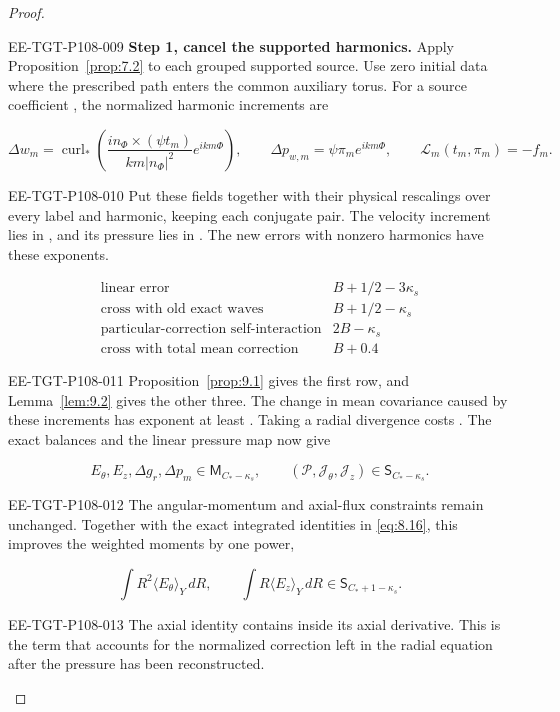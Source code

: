 \begin{proof}
\begin{EESegment}{EE-TGT-P108-009}
\noindent\textbf{Step 1, cancel the supported harmonics.} Apply
Proposition~\ref{prop:7.2} to each grouped supported source. Use zero initial data where the
prescribed path enters the common auxiliary torus. For a source coefficient
, the normalized harmonic increments are
\end{EESegment}
\[
\Delta w_m=\operatorname{curl}_*\!\left(
 \frac{i n_\Phi\times(\psi t_m)}{km|n_\Phi|^2}e^{ikm\Phi}\right),
\qquad
\Delta p_{w,m}=\psi\pi_m e^{ikm\Phi},
\qquad
\mathscr L_m(t_m,\pi_m)=-f_m.
\]
\begin{EESegment}{EE-TGT-P108-010}
Put these fields together with their physical rescalings over every label and harmonic, keeping each
conjugate pair. The velocity increment lies in , and its pressure
lies in . The new errors with nonzero harmonics have these
exponents.
\end{EESegment}
\[
\begin{array}{r|l}
\text{linear error} & B+1/2-3\kappa_s\\
\text{cross with old exact waves} & B+1/2-\kappa_s\\
\text{particular-correction self-interaction} & 2B-\kappa_s\\
\text{cross with total mean correction} & B+0.4
\end{array}
\]
\begin{EESegment}{EE-TGT-P108-011}
Proposition~\ref{prop:9.1} gives the first row, and Lemma~\ref{lem:9.2} gives the other three. The
change in mean covariance caused by these increments has exponent at least
. Taking a radial divergence costs
. The exact balances and the linear pressure map now give
\end{EESegment}
\[
E_\theta,E_z,\Delta g_r,\Delta p_m\in \mathsf M_{C_*-\kappa_s},
\qquad
(\mathcal P,\mathcal J_\theta,\mathcal J_z)\in \mathsf S_{C_*-\kappa_s}.
\]
\begin{EESegment}{EE-TGT-P108-012}
The angular-momentum and axial-flux constraints remain unchanged. Together with the exact integrated
identities in \eqref{eq:8.16}, this improves the weighted moments by one power,
\end{EESegment}
\begin{equation}
\int R^2\langle E_\theta\rangle_Y\,dR,
\qquad
\int R\langle E_z\rangle_Y\,dR
\in \mathsf S_{C_*+1-\kappa_s}.
\tag{9.12}\label{eq:9.12}
\end{equation}
\begin{EESegment}{EE-TGT-P108-013}
The axial identity contains  inside its axial derivative.
This is the term that accounts for the normalized correction
 left in the radial equation after the pressure has been
reconstructed.
\end{EESegment}


\end{proof}
